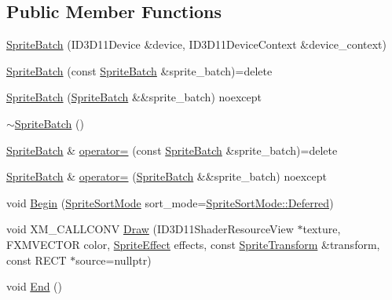 \subsection*{Public Member Functions}
\begin{DoxyCompactItemize}
\item 
\mbox{\hyperlink{classmage_1_1rendering_1_1_sprite_batch_a44e4cca2560beccf655c87d79dca3d20}{Sprite\+Batch}} (I\+D3\+D11\+Device \&device, I\+D3\+D11\+Device\+Context \&device\+\_\+context)
\item 
\mbox{\hyperlink{classmage_1_1rendering_1_1_sprite_batch_a979cdc21ce17579ded4066f1e6a2d411}{Sprite\+Batch}} (const \mbox{\hyperlink{classmage_1_1rendering_1_1_sprite_batch}{Sprite\+Batch}} \&sprite\+\_\+batch)=delete
\item 
\mbox{\hyperlink{classmage_1_1rendering_1_1_sprite_batch_a91644c1c0c3e53a87f470116ec9746dc}{Sprite\+Batch}} (\mbox{\hyperlink{classmage_1_1rendering_1_1_sprite_batch}{Sprite\+Batch}} \&\&sprite\+\_\+batch) noexcept
\item 
\mbox{\hyperlink{classmage_1_1rendering_1_1_sprite_batch_aedb2831f0054cedb1ede8be8f27e0432}{$\sim$\+Sprite\+Batch}} ()
\item 
\mbox{\hyperlink{classmage_1_1rendering_1_1_sprite_batch}{Sprite\+Batch}} \& \mbox{\hyperlink{classmage_1_1rendering_1_1_sprite_batch_a336c16ed2eee2ef9fe8520903033f63e}{operator=}} (const \mbox{\hyperlink{classmage_1_1rendering_1_1_sprite_batch}{Sprite\+Batch}} \&sprite\+\_\+batch)=delete
\item 
\mbox{\hyperlink{classmage_1_1rendering_1_1_sprite_batch}{Sprite\+Batch}} \& \mbox{\hyperlink{classmage_1_1rendering_1_1_sprite_batch_ae5de43894a07d86a0d2e4150080a7990}{operator=}} (\mbox{\hyperlink{classmage_1_1rendering_1_1_sprite_batch}{Sprite\+Batch}} \&\&sprite\+\_\+batch) noexcept
\item 
void \mbox{\hyperlink{classmage_1_1rendering_1_1_sprite_batch_ae90ef53946738b7933ee69004dbbe63c}{Begin}} (\mbox{\hyperlink{namespacemage_1_1rendering_a4fad00dbca0c8d854c765ab831c76055}{Sprite\+Sort\+Mode}} sort\+\_\+mode=\mbox{\hyperlink{namespacemage_1_1rendering_aeb14ce7610cc9391f4e01be027b91dcca4ed71db54748b36eeb398876b0c747ac}{Sprite\+Sort\+Mode\+::\+Deferred}})
\item 
void X\+M\+\_\+\+C\+A\+L\+L\+C\+O\+NV \mbox{\hyperlink{classmage_1_1rendering_1_1_sprite_batch_ae74068fb6f2bcc084a810a12c2eb478c}{Draw}} (I\+D3\+D11\+Shader\+Resource\+View $\ast$texture, F\+X\+M\+V\+E\+C\+T\+OR color, \mbox{\hyperlink{namespacemage_1_1rendering_a4dbc3536c87b906f1d41d863ec458e78}{Sprite\+Effect}} effects, const \mbox{\hyperlink{classmage_1_1_sprite_transform}{Sprite\+Transform}} \&transform, const R\+E\+CT $\ast$source=nullptr)
\item 
void \mbox{\hyperlink{classmage_1_1rendering_1_1_sprite_batch_ac27b9692f118361853c94af91b3d4d2d}{End}} ()
\end{DoxyCompactItemize}

